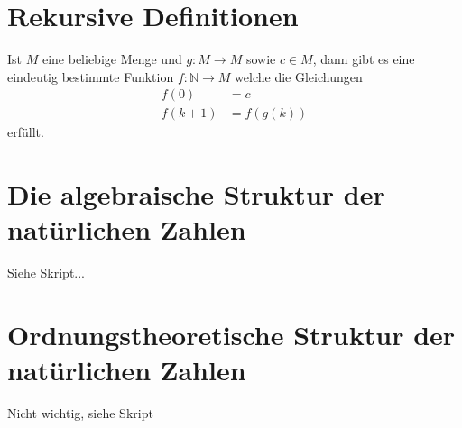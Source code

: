 \section{Rekursive Definitionen} %
\label{sec:rekursive_definitionen}
Ist \(M\) eine beliebige Menge und \(g: M \rightarrow M\) sowie \(c \in M\), dann gibt es eine eindeutig bestimmte Funktion \(f: \mathbb{N} \rightarrow M\) welche die Gleichungen
\begin{align*}
	f(0) &= c \\
	f(k+1) &= f(g(k))
\end{align*}
erfüllt.

\section{Die algebraische Struktur der natürlichen Zahlen} %
\label{sec:die_algebraische_struktur_der_natürlichen_zahlen}
Siehe Skript...

\section{Ordnungstheoretische Struktur der natürlichen Zahlen} %
\label{sec:ordnungstheoretische_struktur_der_natürlichen_zahlen}
Nicht wichtig, siehe Skript
